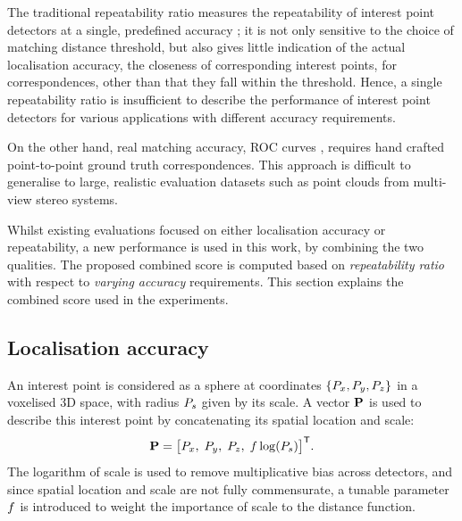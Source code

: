 The traditional repeatability ratio measures the repeatability of interest point detectors at a single, predefined accuracy \cite{Schmid2000}; it is not only sensitive to the choice of matching distance threshold, but also gives little indication of the actual localisation accuracy, \ie the closeness of corresponding interest points, for correspondences, other than that they fall within the threshold. Hence, a single repeatability ratio is insufficient to describe the performance of interest point detectors for various applications with different accuracy requirements. 

On the other hand, real matching accuracy, \eg ROC curves \cite{Bowyer1999}, requires hand crafted point-to-point ground truth correspondences. This approach is difficult to generalise to large, realistic evaluation datasets such as point clouds from multi-view stereo systems.     

Whilst existing evaluations focused on either localisation accuracy or repeatability, a new performance is used in this work, by combining the two qualities. The proposed combined score is computed based on \emph{repeatability ratio} with respect to \emph{varying accuracy} requirements. This section explains the combined score used in the experiments. 

\subsection{Localisation accuracy}
An interest point is considered as a sphere at coordinates $\{P_x, P_y, P_z\}$ in a voxelised 3D space, with radius $P_s$ given by its scale. A vector $\mathbf{P}$ is used to describe this interest point by concatenating its spatial location and scale: 
\begin{equation}
	\mathbf{P} = \big[ P_x,\;P_y,\;P_z,\;f\log(P_s) \big]^\mathsf{T}.
\label{eqn/eval/loc_vec}
\end{equation}
The logarithm of scale is used to remove multiplicative bias across detectors, and since spatial location and scale are not fully commensurate, a tunable parameter $f$ is introduced to weight the importance of scale to the distance function.

